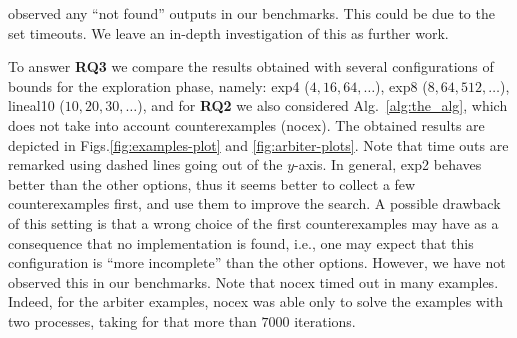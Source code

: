 observed any ``not found'' outputs in our benchmarks. This could be due to  the set timeouts.  We leave an in-depth investigation of this as further work.

 To answer \textbf{RQ3}   we compare the results obtained with several configurations of bounds for the exploration phase, namely: \textsf{exp4} ($4,16,64,\dots$),  \textsf{exp8} ($8,64,512,\dots$),  \textsf{lineal10} ($10,20,30,\dots$), and for \textbf{RQ2} we also considered Alg.~\ref{alg:the_alg},  which does not take into account counterexamples (\textsf{nocex}).  The obtained results are depicted in Figs.\ref{fig:examples-plot} and \ref{fig:arbiter-plots}.  Note that time outs are remarked using dashed lines going out of the $y$-axis.
 In general, \textsf{exp2} behaves better than the other options,  thus it seems better to collect a few counterexamples first, and use them to improve the search.  A possible drawback of this setting is that a wrong choice of the first counterexamples may have as a consequence that no implementation is found,  i.e., one may expect that this configuration  is ``more incomplete''   than the other options. However, we have not observed this in our benchmarks.  Note that \textsf{nocex} timed out in many examples. Indeed, for the arbiter examples, \textsf{nocex} was able only to solve the examples with two processes,  taking for that more than $7000$ iterations.

